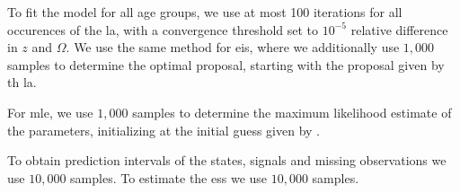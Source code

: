 
To fit the model for all age groups, we use at most 100 iterations for all occurences of the \acrshort{la}, with a convergence threshold set to $10^{-5}$ relative difference in $z$ and $\Omega$. We use the same method for \acrshort{eis}, where we additionally use $1,000$ samples to determine the optimal proposal, starting with the proposal given by th \acrshort{la}.

For \acrshort{mle}, we use $1,000$ samples to determine the maximum likelihood estimate of the parameters, initializing at the initial guess given by .

To obtain prediction intervals of the states, signals and missing observations we use $10,000$ samples. To estimate the \acrshort{ess} we use $10,000$ samples.
